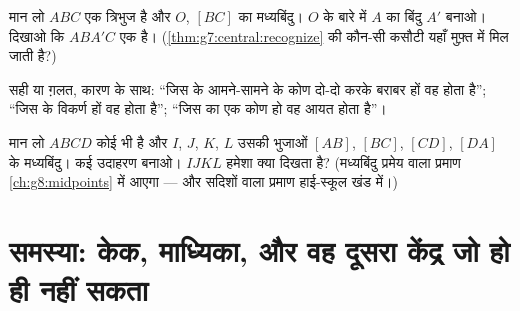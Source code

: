 \begin{exercise}[$\star\star$]\label{exo:g7:central:9}
मान लो $ABC$ एक त्रिभुज है और $O$, $[BC]$ का मध्यबिंदु। $O$ के बारे
में $A$ का  बिंदु $A'$ बनाओ। दिखाओ कि $ABA'C$ एक  है। (\cref{thm:g7:central:recognize} की कौन-सी कसौटी यहाँ
मुफ़्त में मिल जाती है?)
\end{exercise}

\begin{exercise}[$\star\star$]\label{exo:g7:central:10}
सही या ग़लत, कारण के साथ: ``जिस  के आमने-सामने के कोण
दो-दो करके बराबर हों वह  होता है''; ``जिस  के विकर्ण  हों वह  होता है''; ``जिस  का एक कोण  हो वह आयत होता है''।
\end{exercise}

\begin{exercise}[$\star\star\star$]\label{exo:g7:central:11}
मान लो $ABCD$ कोई भी  है और $I$, $J$, $K$, $L$ उसकी भुजाओं
$[AB]$, $[BC]$, $[CD]$, $[DA]$ के मध्यबिंदु। कई उदाहरण बनाओ।
$IJKL$ हमेशा क्या दिखता है? (मध्यबिंदु प्रमेय वाला प्रमाण
\cref{ch:g8:midpoints} में आएगा --- और सदिशों वाला प्रमाण
हाई-स्कूल खंड में।)
\end{exercise}

\section{समस्या: केक, माध्यिका, और वह दूसरा केंद्र जो हो ही नहीं
सकता}


